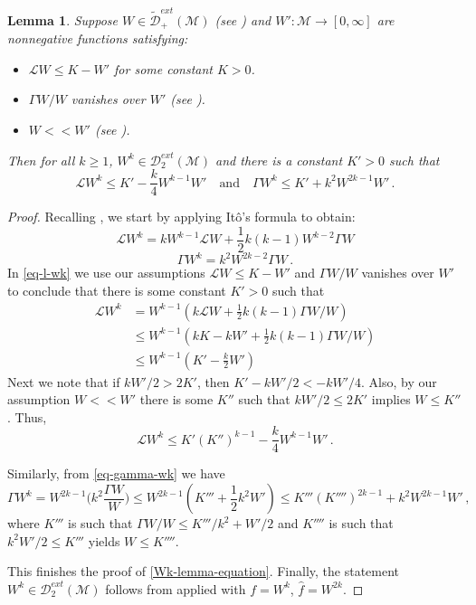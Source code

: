 \documentclass[final]{amsart}
\newtheorem{lem}[thm]{Lemma}
\numberwithin{thm}{section}
\numberwithin{equation}{section}
\newcommand{\mcM}{\mathcal{M}}
\newcommand{\Dme}{\mathcal{D}^{ext}}
\newcommand{\tDme}{\tilde{\mathcal{D}}^{ext}}
\newcommand{\Ll}{\mathcal{L}}
\begin{document}
\begin{lem}
\label{Wk-lemma}
    Suppose $W \in \tDme_+(\mcM)$ (see ) and $W': \mcM \to [0,\infty]$ are nonnegative functions satisfying:
    \begin{itemize}
        \item $\Ll W \leq K - W'$ for some constant $K > 0$.
        \item $\Gamma W / W$ vanishes over $W'$ (see ).
        \item $W << W'$ (see \Cref{<<}).
    \end{itemize}
    Then for all $k \geq 1$, $W^k \in \Dme_2(\mcM)$ and there is a constant $K' > 0$ such that \begin{equation}\label{Wk-lemma-equation}
        \Ll W^k \leq K' - \frac{k}{4}W^{k-1}W' \quad \text{and} \quad \Gamma W^k \leq K' + k^2W^{2k-1}W' \,.
    \end{equation}
\end{lem}

\begin{proof}
    Recalling , we start by applying It\^{o}'s formula to obtain:
    \begin{equation}\label{eq-l-wk}
        \Ll W^k = kW^{k-1}\Ll W + \frac{1}{2}k(k-1)W^{k-2}\Gamma W
    \end{equation}
    \begin{equation}\label{eq-gamma-wk}
        \Gamma W^k = k^2W^{2k-2}\Gamma W \,.
    \end{equation}
    In \eqref{eq-l-wk} we use our assumptions $\Ll W \leq K - W'$ and $\Gamma W/W$ vanishes over $W'$ to conclude that there is some constant $K' > 0$ such that
    \begin{align*}
        \Ll W^k &= W^{k-1}(k\Ll W + \frac{1}{2}k(k-1)\Gamma W/W) \\
        &\leq W^{k-1}(kK - kW' + \frac{1}{2}k(k-1)\Gamma W/W) \\
        &\leq W^{k-1}(K' - \frac{k}{2}W')
    \end{align*}
    Next we note that if $kW'/2 > 2K'$, then $K' - kW'/2 < -kW'/4$. Also, by our assumption $W << W'$ there is some $K''$ such that $kW'/2 \leq 2K'$ implies $W \leq K''$. Thus,
    $$\Ll W^k \leq K'(K'')^{k-1}-\frac{k}{4}W^{k-1}W' \,.$$

    Similarly, from \eqref{eq-gamma-wk} we have \begin{equation*}
        \Gamma W^k = W^{2k-1}\Big(k^2 \frac{\Gamma W}{W}\Big) \leq W^{2k-1}(K''' + \frac{1}{2}k^2W') \leq K'''(K'''')^{2k-1} + k^2W^{2k-1}W' \,,
    \end{equation*}
    where $K'''$ is such that $\Gamma W / W \leq K'''/k^2 + W'/2$ and $K''''$ is such that $k^2W'/2 \leq K'''$ yields $W \leq K''''$.

    This finishes the proof of \eqref{Wk-lemma-equation}. Finally, the statement $W^k \in \Dme_2(\mcM)$ follows from  applied with $f = W^k$, $\hat f = W^{2k}$.
\end{proof}
\end{document}

